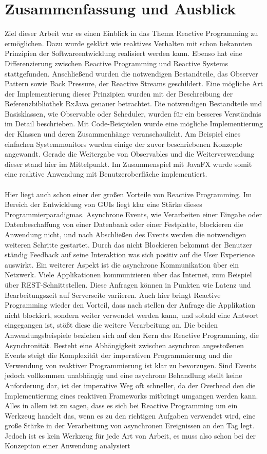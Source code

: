 \chapter{Zusammenfassung und Ausblick}\label{eval}
Ziel dieser Arbeit war es einen Einblick in das Thema Reactive Programming zu ermöglichen. Dazu wurde geklärt wie reaktives Verhalten mit schon bekannten Prinzipien der Softwareentwicklung realisiert werden kann. Ebenso hat eine Differenzierung zwischen Reactive Programming und Reactive Systems stattgefunden. Anschließend wurden die notwendigen Bestandteile, das Observer Pattern sowie Back Pressure, der Reactive Streams geschildert. Eine mögliche Art der Implementierung dieser Prinzipien wurden mit der Beschreibung der Referenzbibliothek RxJava genauer betrachtet. Die notwendigen Bestandteile und Basisklassen, wie Observable oder Scheduler, wurden für ein besseres Verständnis im Detail beschrieben. Mit Code-Beispielen wurde eine mögliche Implementierung der Klassen und deren Zusammenhänge veranschaulicht. Am Beispiel eines einfachen Systemmonitors wurden einige der zuvor beschriebenen Konzepte angewandt. Gerade die Weitergabe von Observables und die Weiterverwendung dieser stand hier im Mittelpunkt. Im Zusammenspiel mit JavaFX wurde somit eine reaktive Anwendung mit Benutzeroberfläche implementiert. \\ \\ Hier liegt auch schon einer der großen Vorteile von Reactive Programming. Im Bereich der Entwicklung von GUIs liegt klar eine Stärke dieses Programmierparadigmas. Asynchrone Events, wie Verarbeiten einer Eingabe oder Datenbeschaffung von einer Datenbank oder einer Festplatte, blockieren die Anwendung nicht, und nach Abschließen des Events werden die notwendigen weiteren Schritte gestartet. Durch das nicht Blockieren bekommt der Benutzer ständig Feedback auf seine Interaktion was sich positiv auf die User Experience auswirkt. Ein weiterer Aspekt ist die asynchrone Kommunikation über ein Netzwerk. Viele Applikationen kommunizieren über das Internet, zum Beispiel über REST-Schnittstellen. Diese Anfragen können in Punkten wie Latenz und Bearbeitungszeit auf Serverseite variieren. Auch hier bringt Reactive Programming wieder den Vorteil, dass nach stellen der Anfrage die Applikation nicht blockiert, sondern weiter verwendet werden kann, und sobald eine Antwort eingegangen ist, stößt diese die weitere Verarbeitung an. Die beiden Anwendungsbeispiele beziehen sich auf den Kern des Reactive Programming, die Asynchronität. Besteht eine Abhängigkeit zwischen asynchron angestoßenen Events steigt die Komplexität der imperativen Programmierung und die Verwendung von reaktiver Programmierung ist klar zu bevorzugen. Sind Events jedoch vollkommen unabhängig und eine asychrone Behandlung stellt keine Anforderung dar, ist der imperative Weg oft schneller, da der Overhead den die Implementierung eines reaktiven Frameworks mitbringt umgangen werden kann. Alles in allem ist zu sagen, dass es sich bei Reactive Programming um ein Werkzeug handelt das, wenn es zu den richtigen Aufgaben verwendet wird, eine große Stärke in der Verarbeitung von asynchronen Ereignissen an den Tag legt. Jedoch ist es kein Werkzeug für jede Art von Arbeit, es muss also schon bei der Konzeption einer Anwendung analysiert 